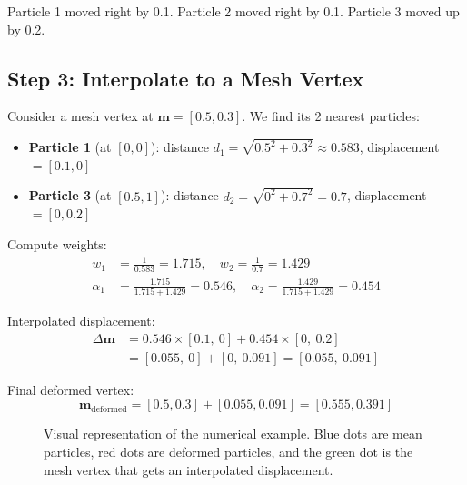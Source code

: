 \documentclass[12pt,a4paper]{article}
\begin{document}
Particle 1 moved right by 0.1. Particle 2 moved right by 0.1. Particle 3 moved up by 0.2.

\subsection{Step 3: Interpolate to a Mesh Vertex}

Consider a mesh vertex at $\mathbf{m} = [0.5, 0.3]$. We find its 2 nearest particles:

\begin{itemize}
    \item \textbf{Particle 1} (at $[0, 0]$): distance $d_1 = \sqrt{0.5^2 + 0.3^2} \approx 0.583$, displacement $= [0.1, 0]$
    \item \textbf{Particle 3} (at $[0.5, 1]$): distance $d_2 = \sqrt{0^2 + 0.7^2} = 0.7$, displacement $= [0, 0.2]$
\end{itemize}

Compute weights:
\begin{align}
w_1 &= \frac{1}{0.583} = 1.715, \quad w_2 = \frac{1}{0.7} = 1.429 \\[0.5em]
\alpha_1 &= \frac{1.715}{1.715 + 1.429} = 0.546, \quad \alpha_2 = \frac{1.429}{1.715 + 1.429} = 0.454
\end{align}

Interpolated displacement:
\begin{align}
\Delta \mathbf{m} &= 0.546 \times [0.1,\ 0] + 0.454 \times [0,\ 0.2] \\
&= [0.055,\ 0] + [0,\ 0.091] = [0.055,\ 0.091]
\end{align}

Final deformed vertex:
\begin{equation}
\boxed{\mathbf{m}_{\text{deformed}} = [0.5, 0.3] + [0.055, 0.091] = [0.555, 0.391]}
\end{equation}

\begin{figure}[H]
    \centering
    \caption{Visual representation of the numerical example. Blue dots are mean particles, red dots are deformed particles, and the green dot is the mesh vertex that gets an interpolated displacement.}
    \label{fig:numerical_example}
\end{figure}
\end{document}
